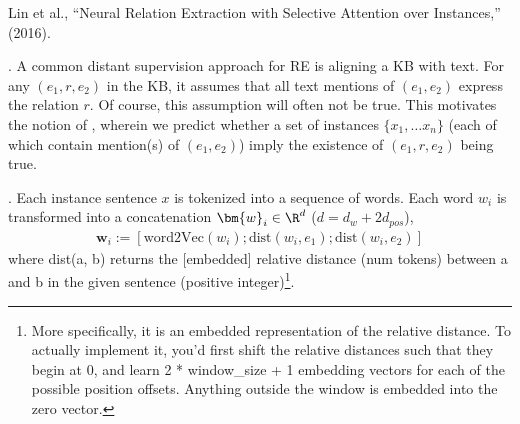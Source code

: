 \documentclass[11pt]{article}
\renewcommand\vec[2][]{\bm{#2}_{#1}}
\newcommand\myspace[1][]{\vspace{#1\bigskipamount}}
\newcommand\p{\Needspace{10\baselineskip} \noindent}
\begin{document}
\vspace{-1em}
{\footnotesize Lin et al., ``Neural Relation Extraction with Selective Attention over Instances,'' (2016).}

\p {}. A common distant supervision approach for RE is aligning a KB with text. For any $(e_1, r, e_2)$ in the KB, it assumes that all text mentions of $(e_1, e_2)$ express the relation $r$. Of course, this assumption will often not be true. This motivates the notion of , wherein we predict whether a set of instances $\{x_1, \ldots x_n\}$ (each of which contain mention(s) of $(e_1, e_2)$) imply the existence of $(e_1, r, e_2)$ being true.

\myspace
\p {}. Each instance sentence $x$ is tokenized into a sequence of words. Each word $w_i$ is transformed into a concatenation $\vec[i]{w} \in \R^{d}$ ($d = d_w + 2 d_{pos}$), 
\begin{align}
	\vec[i]{w} := [\text{word2Vec}(w_i); \text{dist}(w_i, e_1); \text{dist}(w_i, e_2)]
\end{align} 
where dist(a, b) returns the [embedded] relative distance (num tokens) between a and b in the given sentence (positive integer)\footnote{More specifically, it is an embedded representation of the relative distance. To actually implement it,  you'd first shift the relative distances such that they begin at 0, and learn 2 * window\_size + 1 embedding vectors for each of the possible position offsets. Anything outside the window is embedded into the zero vector.}.
\end{document}
